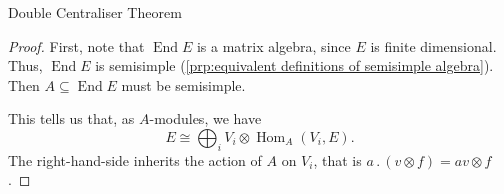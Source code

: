 \documentclass[fleqn]{NotesClass}
\DeclareMathOperator{\End}{End}
\DeclareMathOperator{\Hom}{Hom}
\newcommand{\action}{\mathbin{.}}
\newcommand{\isomorphic}{\cong}
\begin{document}
\begin{thm}{Double Centraliser Theorem}{}
\begin{proof}
%            
            First, note that \(\End E\) is a matrix algebra, since \(E\) is finite dimensional.
            Thus, \(\End E\) is semisimple (\cref{prp:equivalent definitions of semisimple algebra}).
            Then \(A \subseteq \End E\) must be semisimple.
            
            This tells us that, as \(A\)-modules, we have
            \begin{equation}
                E \isomorphic \bigoplus_i V_i \otimes \Hom_A(V_i, E).
            \end{equation}
            The right-hand-side inherits the action of \(A\) on \(V_i\), that is \(a \action (v \otimes f) = av \otimes f\).
            

\end{proof}
\end{thm}
\end{document}
